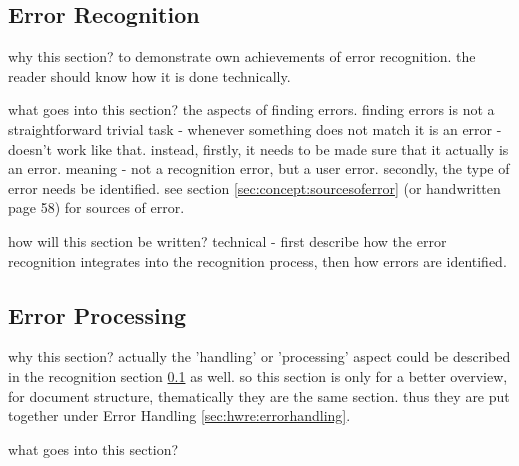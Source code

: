 \subsection{Error Recognition}
\label{sec:hwre:errorrecognition}



why this section? to demonstrate own achievements of error recognition.
the reader should know how it is done technically.

what goes into this section? the aspects of finding errors. finding errors
is not a straightforward trivial task - whenever something does not match
it is an error - doesn't work like that. instead, 
firstly, it needs to be made sure that it actually is an error.
meaning - not a recognition error, but a user error.
secondly, the type of error needs be identified.
see section \ref{sec:concept:sourcesoferror} (or handwritten page 58)
for sources of error.

how will this section be written?
technical - first describe how the error recognition integrates into the
recognition process, then how errors are identified.


\subsection{Error Processing}
\label{sec:hwre:errorprocessing}




why this section? 
actually the 'handling' or 'processing' aspect could be 
described in the recognition section \ref{sec:hwre:errorrecognition} as well.
so this section is only for a better overview, for document structure, 
thematically they are the same section. thus they are put together under
Error Handling \ref{sec:hwre:errorhandling}.

what goes into this section?

